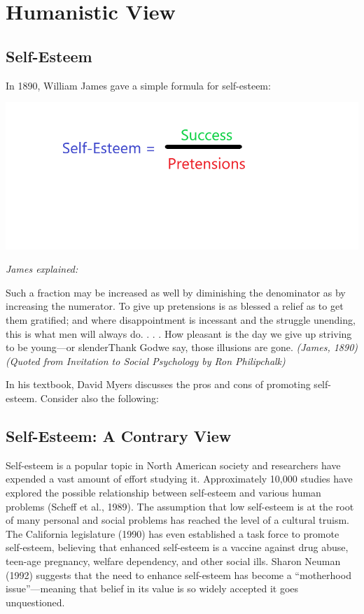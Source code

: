 \documentclass[
]{book}
\begin{document}
\hypertarget{humanistic-view}{%
\section{Humanistic View}\label{humanistic-view}}

\hypertarget{self-esteem}{%
\subsection*{Self-Esteem}\label{self-esteem}}

In 1890, William James gave a simple formula for self-esteem:

\includegraphics{assets/unit_5/Unit5_Topic2_Image.png}

\emph{James explained:}

Such a fraction may be increased as well by diminishing the denominator as by increasing the numerator. To give up pretensions is as blessed a relief as to get them gratified; and where disappointment is incessant and the struggle unending, this is what men will always do. . . . How pleasant is the day we give up striving to be young---or slenderThank Godwe say, those illusions are gone. \emph{(James, 1890) (Quoted from Invitation to Social Psychology by Ron Philipchalk)}

In his textbook, David Myers discusses the pros and cons of promoting self-esteem. Consider also the following:

\hypertarget{self-esteem-a-contrary-view}{%
\subsection*{Self-Esteem: A Contrary View}\label{self-esteem-a-contrary-view}}

Self-esteem is a popular topic in North American society and researchers have expended a vast amount of effort studying it. Approximately 10,000 studies have explored the possible relationship between self-esteem and various human problems (Scheff et al., 1989). The assumption that low self-esteem is at the root of many personal and social problems has reached the level of a cultural truism. The California legislature (1990) has even established a task force to promote self-esteem, believing that enhanced self-esteem is a vaccine against drug abuse, teen-age pregnancy, welfare dependency, and other social ills. Sharon Neuman (1992) suggests that the need to enhance self-esteem has become a ``motherhood issue''---meaning that belief in its value is so widely accepted it goes unquestioned.
\end{document}
